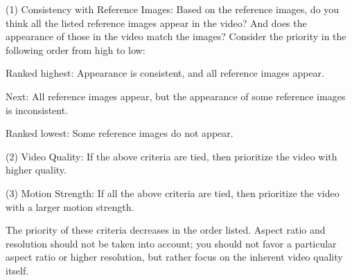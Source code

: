\documentclass{article} %
\begin{document}
(1) Consistency with Reference Images: Based on the reference images, do you think all the listed reference images appear in the video? And does the appearance of those in the video match the images? Consider the priority in the following order from high to low:

Ranked highest: Appearance is consistent, and all reference images appear.

Next: All reference images appear, but the appearance of some reference images is inconsistent.

Ranked lowest: Some reference images do not appear.

(2) Video Quality: If the above criteria are tied, then prioritize the video with higher quality.

(3) Motion Strength: If all the above criteria are tied, then prioritize the video with a larger motion strength.

The priority of these criteria decreases in the order listed. Aspect ratio and resolution should not be taken into account; you should not favor a particular aspect ratio or higher resolution, but rather focus on the inherent video quality itself.
\end{document}
